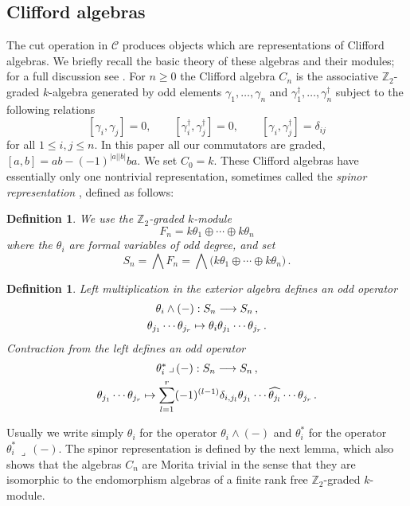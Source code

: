 \documentclass[english,letter paper,12pt,leqno]{article}
\theoremstyle{example}
\newtheorem{definition}[theorem]{Definition}
\numberwithin{equation}{section}
\def\be{\begin{equation}}
\def\ee{\end{equation}}
\def\nZ{\mathds{Z}}
\def\L{\mathcal{C}}
\def\ferm{\gamma}
\def\fermc{\gamma^\dagger}
\begin{document}
\subsection{Clifford algebras}\label{section:clifford_algs}

The cut operation in $\L$ produces objects which are representations of Clifford algebras. We briefly recall the basic theory of these algebras and their modules; for a full discussion see \cite{friedrich}. For $n \ge 0$ the Clifford algebra $C_n$ is the associative $\mathbb{Z}_2$-graded $k$-algebra generated by odd elements $\ferm_1,\ldots,\ferm_n$ and $\fermc_1, \ldots, \fermc_n$ subject to the following relations
\be\label{eq:clifford_relations}
[\ferm_i, \ferm_j] = 0, \qquad [\fermc_i, \fermc_j] = 0, \qquad [\ferm_i, \fermc_j] = \delta_{ij}
\ee
for all $1 \le i, j \le n$. In this paper all our commutators are graded, $[a,b] = ab - (-1)^{|a||b|} ba$. We set $C_0 = k$. These Clifford algebras have essentially only one nontrivial representation, sometimes called the \emph{spinor representation} \cite[p.14]{friedrich}, defined as follows:

\begin{definition} We use the $\nZ_2$-graded $k$-module
\be
F_n = k \theta_1 \oplus \cdots \oplus k \theta_n
\ee
where the $\theta_i$ are formal variables of odd degree, and set
\be
S_n = \bigwedge F_n = \bigwedge\big( k \theta_1 \oplus \cdots \oplus k \theta_n \big)\,.
\ee
\end{definition}

\begin{definition}\label{defn:contraction} Left multiplication in the exterior algebra defines an odd operator
\begin{gather*}
\theta_i \wedge (-): S_n \longrightarrow S_n\,,\\
\theta_{j_1} \cdots \theta_{j_r} \mapsto \theta_i \theta_{j_1} \cdots \theta_{j_r}\,.
\end{gather*}
Contraction from the left defines an odd operator
\begin{gather*}
\theta_i^*\, \lrcorner\, (-): S_n \longrightarrow S_n\,,\\
\theta_{j_1} \cdots \theta_{j_r} \mapsto \sum_{l=1}^r (-1)^{(l-1)} \delta_{i,j_l} \theta_{j_1} \cdots \widehat{ \theta_{j_l} } \cdots \theta_{j_r}\,.
\end{gather*}
\end{definition}

Usually we write simply $\theta_i$ for the operator $\theta_i \wedge (-)$ and $\theta_i^*$ for the operator $\theta_i^*\, \lrcorner\, (-)$. The spinor representation is defined by the next lemma, which also shows that the algebras $C_n$ are Morita trivial in the sense that they are isomorphic to the endomorphism algebras of a finite rank free $\mathbb{Z}_2$-graded $k$-module.
\end{document}
